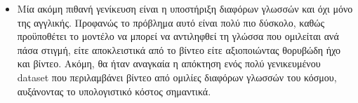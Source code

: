 \begin{itemize}
\item Μία ακόμη πιθανή γενίκευση είναι η υποστήριξη διαφόρων γλωσσών και όχι μόνο της αγγλικής. Προφανώς το πρόβλημα αυτό είναι πολύ πιο δύσκολο, καθώς προϋποθέτει το μοντέλο να μπορεί να αντιληφθεί τη γλώσσα που ομιλείται ανά πάσα στιγμή, είτε αποκλειστικά από το βίντεο είτε αξιοποιώντας θορυβώδη ήχο και βίντεο. Ακόμη, θα ήταν αναγκαία η απόκτηση ενός πολύ γενικευμένου dataset που περιλαμβάνει βίντεο από ομιλίες διαφόρων γλωσσών του κόσμου, αυξάνοντας το υπολογιστικό κόστος σημαντικά.

\end{itemize}